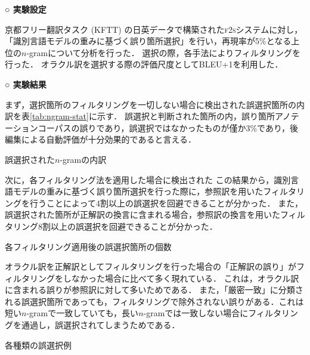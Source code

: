 \documentclass[japanese]{jnlp_1.4}
\newcommand{\textcolor}[2]{}
\begin{document}
\vspace{1\Cvs}
\noindent \textbf{○ 実験設定}

京都フリー翻訳タスク (KFTT) の日英データで構築された\textsc{f2s}システムに対し，「識別言語モデルの重みに基づく誤り箇所選択」を行い，再現率が5\%となる上位の$n$-gramについて分析を行った．
選択の際，各手法によりフィルタリングを行った．
オラクル訳を選択する際の評価尺度としてBLEU+1を利用した．

\vspace{1\Cvs}
\noindent \textbf{○ 実験結果}

まず，選択箇所のフィルタリングを一切しない場合に検出された誤選択箇所の内訳を表\ref{tab:ngram-stat}に示す．
誤選択と判断された箇所の内，誤り箇所アノテーションコーパスの誤りであり，誤選択ではなかったものが僅か3\%であり，後編集による自動評価が十分効果的であると言える．

\begin{table}[b]
\vspace{-0.8\Cvs}
\caption{誤選択された$n$-gramの内訳}
\label{tab:ngram-stat}

\end{table}

次に，各フィルタリング法を適用した場合に検出された\textcolor{black}{誤選択箇所の個数を表\ref{tab:ngram-stat-ratio}に示す．}
この結果から，識別言語モデルの重みに基づく誤り箇所選択を行った際に，参照訳を用いたフィルタリングを行うことによって4割以上の誤選択を回避できることが分かった．
また，誤選択された箇所が正解訳の換言に含まれる場合，参照訳の換言を用いたフィルタリング\textcolor{black}{によって3割以上，さらにオラクル訳やオラクル訳の換言を用いたフィルタリングを合わせることで}8割以上の誤選択を回避できることが分かった．

\begin{table}[b]
\caption{各フィルタリング適用後の誤選択箇所の個数}
\label{tab:ngram-stat-ratio}

\end{table}

オラクル訳を正解訳としてフィルタリングを行った場合の「正解訳の誤り」がフィルタリングをしなかった場合に比べて多く現れている．
これは，オラクル訳に含まれる誤りが参照訳に対して多いためである．
また，「厳密一致」に分類される誤選択箇所であっても，フィルタリングで除外されない誤りがある．これは短い$n$-gramで一致していても，長い$n$-gramでは一致しない場合にフィルタリングを通過し，誤選択されてしまうためである．

\begin{table}[b]
\caption{各種類の誤選択例}
\label{tab:example}
\setlength{\fboxsep}{0.1em}

\end{table}
\end{document}
